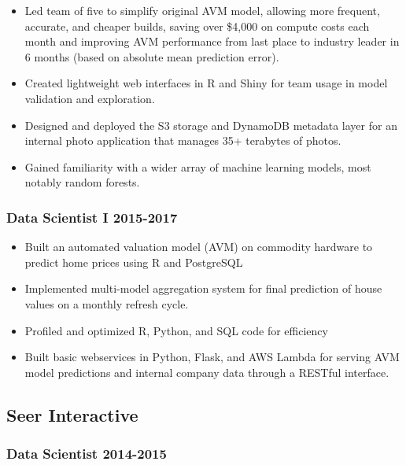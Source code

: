\documentclass[11pt,a4paper,]{awesome-cv}
\providecommand{\tightlist}{%
	\setlength{\itemsep}{0pt}\setlength{\parskip}{0pt}}
\begin{document}
\begin{itemize}
\tightlist
\item
  Led team of five to simplify original AVM model, allowing more
  frequent, accurate, and cheaper builds, saving over \$4,000 on compute
  costs each month and improving AVM performance from last place to
  industry leader in 6 months (based on absolute mean prediction error).
\item
  Created lightweight web interfaces in R and Shiny for team usage in
  model validation and exploration.
\item
  Designed and deployed the S3 storage and DynamoDB metadata layer for
  an internal photo application that manages 35+ terabytes of photos.
\item
  Gained familiarity with a wider array of machine learning models, most
  notably random forests.
\end{itemize}

\hypertarget{data-scientist-i--2017}{%
\subsubsection{\texorpdfstring{Data Scientist I
\hfill 2015-2017}{Data Scientist I -2017}}\label{data-scientist-i--2017}}

\begin{itemize}
\tightlist
\item
  Built an automated valuation model (AVM) on commodity hardware to
  predict home prices using R and PostgreSQL
\item
  Implemented multi-model aggregation system for final prediction of
  house values on a monthly refresh cycle.
\item
  Profiled and optimized R, Python, and SQL code for efficiency
\item
  Built basic webservices in Python, Flask, and AWS Lambda for serving
  AVM model predictions and internal company data through a RESTful
  interface.
\end{itemize}

\hypertarget{seer-interactive}{%
\subsection{\texorpdfstring{Seer Interactive
\hfill }{Seer Interactive }}\label{seer-interactive}}

\hypertarget{data-scientist--2015}{%
\subsubsection{\texorpdfstring{Data Scientist
\hfill 2014-2015}{Data Scientist -2015}}\label{data-scientist--2015}}
\end{document}
